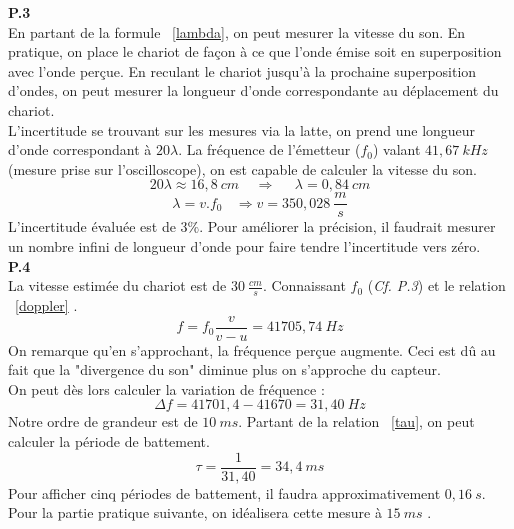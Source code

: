\documentclass	[11pt, a4paper, openany]{book}
\begin{document}
\textbf{P.3}\\
En partant de la formule ~\eqref{lambda}, on peut mesurer la vitesse du son. En pratique, on place le chariot de façon à ce que l'onde émise soit en superposition avec l'onde perçue. En reculant le chariot jusqu'à la prochaine superposition d'ondes, on peut mesurer la longueur d'onde correspondante au déplacement du chariot.\\

L'incertitude se trouvant sur les mesures via la latte, on prend une longueur d'onde correspondant à $20\lambda$. La fréquence de l'émetteur ($f_0$) valant $41,67\ kHz$ (mesure prise sur l'oscilloscope), on est capable de calculer la vitesse du son.
\begin{equation}
20\lambda \approx 16,8\ cm\ \ \ \ \ \Rightarrow\ \ \ \ \ \ \lambda = 0,84\ cm
\end{equation}
\begin{equation}
\lambda = v.f_0\ \ \ \ \Rightarrow v = 350,028\ \frac{m}{s}
\end{equation}
L'incertitude évaluée est de $3\%$. Pour améliorer la précision, il faudrait mesurer un nombre infini de longueur d'onde pour faire tendre l'incertitude vers zéro.\\

\textbf{P.4}\\
La vitesse estimée du chariot est de $30\ \frac{cm}{s}$. Connaissant $f_0$ (\textit{Cf. P.3}) et le relation ~\eqref{doppler} .
\begin{equation}
f = f_0 \frac{v}{v - u} = 41705,74\ Hz
\end{equation} 
On remarque qu'en s'approchant, la fréquence perçue augmente. Ceci est dû au fait que la "divergence du son" diminue plus on s'approche du capteur.\\
On peut dès lors calculer la variation de fréquence :
\begin{equation}
\Delta f =  41701,4 - 41670 = 31,40\ Hz
\end{equation}
Notre ordre de grandeur est de $10\ ms$. Partant de la relation ~\eqref{tau}, on peut calculer la période de battement.
\begin{equation}
\tau = \frac{1}{31,40} = 34,4\ ms
\end{equation}
Pour afficher cinq périodes de battement, il faudra approximativement $0,16\ s$. Pour la partie pratique suivante, on idéalisera cette mesure à $15\ ms$ .\\
\end{document}
